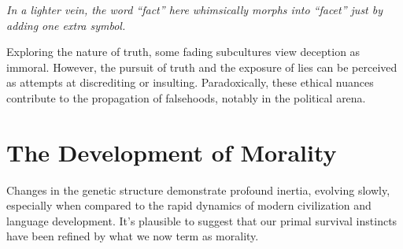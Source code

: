 \documentclass[11pt,a4]{article}
\begin{document}
\textit{In a lighter vein, the word “fact” here whimsically morphs into “facet” just by adding one extra symbol.
} \\
\par

Exploring the nature of truth, some fading subcultures view deception as immoral. However, the pursuit of truth and the exposure of lies can be perceived as attempts at discrediting or insulting. Paradoxically, these ethical nuances contribute to the propagation of falsehoods, notably in the political arena.\\



\section{The Development of Morality}

Changes in the genetic structure demonstrate profound inertia, evolving slowly, especially when compared to the rapid dynamics of modern civilization and language development. It's plausible to suggest that our primal survival instincts have been refined by what we now term as morality.
\end{document}
